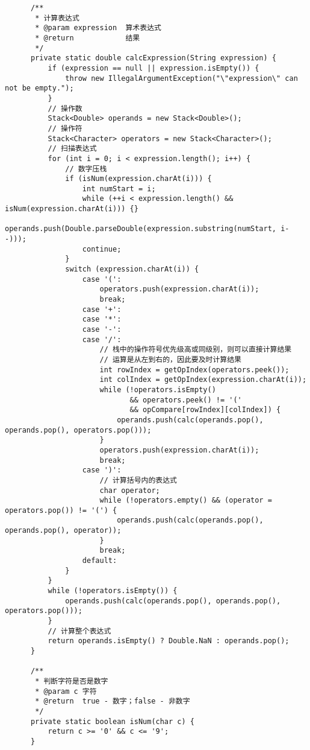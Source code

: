 \documentclass{article}
\begin{document}
\begin{verbatim}
      /**
       * 计算表达式
       * @param expression  算术表达式
       * @return            结果
       */
      private static double calcExpression(String expression) {
          if (expression == null || expression.isEmpty()) {
              throw new IllegalArgumentException("\"expression\" can not be empty.");
          }
          // 操作数
          Stack<Double> operands = new Stack<Double>();
          // 操作符
          Stack<Character> operators = new Stack<Character>();
          // 扫描表达式
          for (int i = 0; i < expression.length(); i++) {
              // 数字压栈
              if (isNum(expression.charAt(i))) {
                  int numStart = i;
                  while (++i < expression.length() && isNum(expression.charAt(i))) {}
                  operands.push(Double.parseDouble(expression.substring(numStart, i--)));
                  continue;
              }
              switch (expression.charAt(i)) {
                  case '(':
                      operators.push(expression.charAt(i));
                      break;
                  case '+':
                  case '*':
                  case '-':
                  case '/':
                      // 栈中的操作符号优先级高或同级别，则可以直接计算结果
                      // 运算是从左到右的，因此要及时计算结果
                      int rowIndex = getOpIndex(operators.peek());
                      int colIndex = getOpIndex(expression.charAt(i));
                      while (!operators.isEmpty()
                             && operators.peek() != '('
                             && opCompare[rowIndex][colIndex]) {
                          operands.push(calc(operands.pop(), operands.pop(), operators.pop()));
                      }
                      operators.push(expression.charAt(i));
                      break;
                  case ')':
                      // 计算括号内的表达式
                      char operator;
                      while (!operators.empty() && (operator = operators.pop()) != '(') {
                          operands.push(calc(operands.pop(), operands.pop(), operator));
                      }
                      break;
                  default:
              }
          }
          while (!operators.isEmpty()) {
              operands.push(calc(operands.pop(), operands.pop(), operators.pop()));
          }
          // 计算整个表达式
          return operands.isEmpty() ? Double.NaN : operands.pop();
      }

      /**
       * 判断字符是否是数字
       * @param c 字符
       * @return  true - 数字；false - 非数字
       */
      private static boolean isNum(char c) {
          return c >= '0' && c <= '9';
      }


\end{verbatim}
\end{document}
